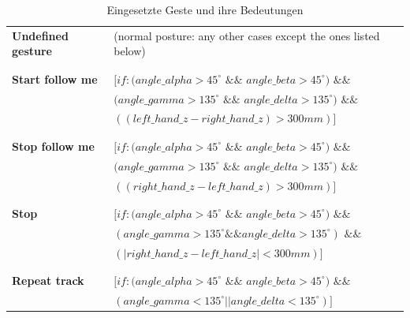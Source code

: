 \begin{table}[h]
\centering
\begin{tabular}{ll}
\textbf{Undefined gesture} & (normal posture: any other cases except the ones
 listed below)\\
 &\\
 &\\
\textbf{Start follow me} & $[if: (angle\_alpha > 45^\circ$ $\&\&$ $angle\_beta >
  45^\circ)$ $\&\&$\\
  & $(angle\_gamma > 135^\circ$ $\&\&$ $angle\_delta >
  135^\circ)$ $\&\&$\\
  & $((left\_hand\_z - right\_hand\_z) > 300 mm)]$\\
  &\\
  &\\
\textbf{Stop follow me} & $[if: (angle\_alpha > 45^\circ$ $\&\&$ $angle\_beta >
  45^\circ)$ $\&\&$\\
  & $(angle\_gamma > 135^\circ$ $\&\&$ $angle\_delta > 135^\circ)$ $\&\&$\\
  & $((right\_hand\_z - left\_hand\_z) > 300 mm)]$\\
  &\\
  &\\
\textbf{Stop} & $[if: (angle\_alpha > 45^\circ$ $\&\&$ $angle\_beta >
45^\circ)$ $\&\&$\\
 & $(angle\_gamma > 135^\circ \&\& angle\_delta > 135^\circ)$ $\&\&$\\
 & $(|right\_hand\_z - left\_hand\_z| < 300 mm)]$\\
 &\\
 &\\
\textbf{Repeat track} & $[if: (angle\_alpha > 45^\circ$ $\&\&$ $angle\_beta >
  45^\circ)$ $\&\&$\\
 & $(angle\_gamma < 135^\circ || angle\_delta < 135^\circ)]$
\end{tabular}
\caption{Eingesetzte Geste und ihre Bedeutungen}
\label{tab:Gesten}
\end{table}

